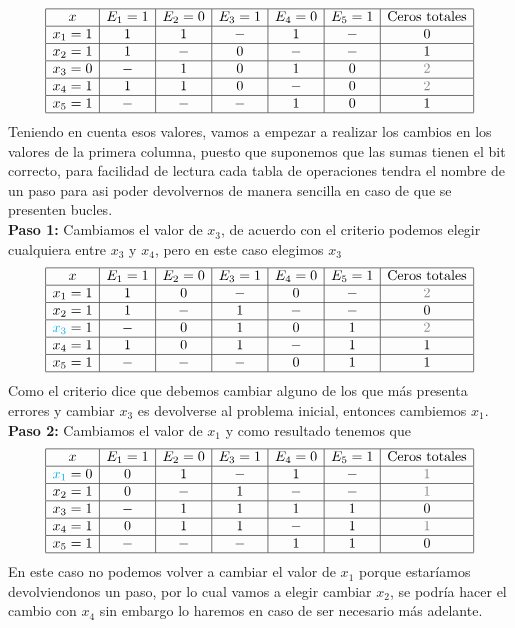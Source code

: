\begin{sol}
\[
\begin{array}{|c|c|c|c|c|c|c|c|}
\hline
x & E_1=1 & E_2=0 & E_3=1 & E_4=0 & E_5=1 & \text{Ceros totales}\\
\hline
x_1= 1& 1 & 1 & - & 1 & - & 0 \\
\hline
x_2=1& 1&-& 0& - &-&1\\
\hline
x_3=0& -& 1& 0 & 1 & 0 &\textcolor{gray}{2}\\
\hline
x_4=1& 1&1&0&-&0&\textcolor{gray}{2}\\
\hline
x_5=1&-&-&-&1&0&1\\
\hline
\end{array}
\]
Teniendo en cuenta esos valores, vamos a empezar a realizar los cambios en los valores de la primera columna, puesto que suponemos que las sumas tienen el bit correcto, para facilidad de lectura cada tabla de operaciones tendra el nombre de un paso para asi poder devolvernos de manera sencilla en caso de que se presenten bucles.\\
\textbf{Paso 1:} Cambiamos el valor de $x_3$, de acuerdo con el criterio podemos elegir cualquiera entre $x_3$ y $x_4$, pero en este caso elegimos $x_3$
\[
\begin{array}{|c|c|c|c|c|c|c|c|}
\hline
x & E_1=1 & E_2=0 & E_3=1 & E_4=0 & E_5=1 & \text{Ceros totales}\\
\hline
x_1= 1& 1 & 0& - & 0& - &\textcolor{gray}{2}\\
\hline
x_2=1& 1&-& 1&- &-&0\\
\hline
\textcolor{cyan}{x_3}=1&-&0&1&0&1&\textcolor{gray}{2}\\
\hline
x_4=1& 1&0&1&-&1&1\\
\hline
x_5=1&-&-&-&0&1&1\\
\hline
\end{array}
\]
Como el criterio dice que debemos cambiar alguno de los que más presenta errores y cambiar $x_3$ es devolverse al problema inicial, entonces cambiemos $x_1$.\\
\textbf{Paso 2:} Cambiamos el valor de $x_1$ y como resultado tenemos que
\[
\begin{array}{|c|c|c|c|c|c|c|c|}
\hline
x & E_1=1 & E_2=0 & E_3=1 & E_4=0 & E_5=1 & \text{Ceros totales}\\
\hline
\textcolor{cyan}{x_1}= 0& 0 & 1& - & 1& - &\textcolor{gray}{1}\\
\hline
x_2=1& 0&-& 1&- &-&\textcolor{gray}{1}\\
\hline
x_3=1&-&1&1&1&1&0\\
\hline
x_4=1& 0&1&1&-&1&\textcolor{gray}{1}\\
\hline
x_5=1&-&-&-&1&1&0\\
\hline
\end{array}
\]
En este caso no podemos volver a cambiar el valor de $x_1$ porque estaríamos devolviendonos un paso, por lo cual vamos a elegir cambiar $x_2$, se podría hacer el cambio con $x_4$ sin embargo lo haremos en caso de ser necesario más adelante.


\end{sol}
